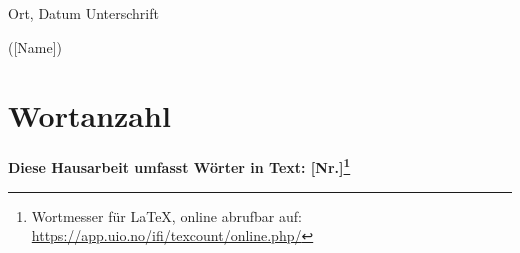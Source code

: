 \documentclass[11pt, a4paper]{article}
\begin{document}
\begin{spacing}{1.3}
\begin{appendices}
\noindent Ort, Datum \hfill  Unterschrift\\
\begin{flushright}
		
 \noindent([Name])
		\end{flushright}

\end{appendices}
\section*{Wortanzahl}
\begin{center}
    \textbf{\large Diese Hausarbeit umfasst Wörter in Text: [Nr.]\footnote{Wortmesser für LaTeX, online abrufbar auf: \url{https://app.uio.no/ifi/texcount/online.php/}}}
\end{center}
\end{spacing}
\end{document}
